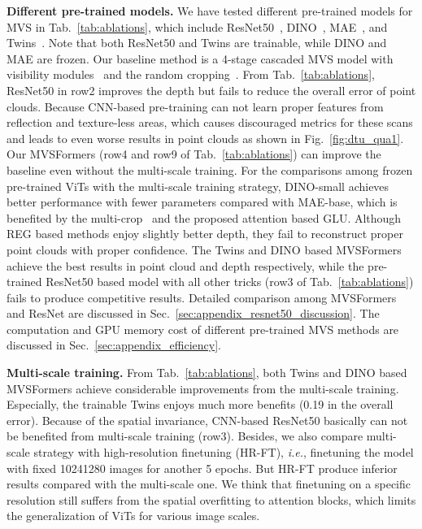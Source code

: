 \documentclass[10pt]{article} \usepackage[preprint]{tmlr}
\begin{document}
\noindent\textbf{Different pre-trained models.}
We have tested different pre-trained models for MVS in Tab.~\ref{tab:ablations}, which include ResNet50~\citep{he2016identity}, DINO~\citep{caron2021emerging}, MAE~\citep{he2021masked}, and Twins~\citep{chu2021twins}. Note that both ResNet50 and Twins are trainable, while DINO and MAE are frozen. Our baseline method is a 4-stage cascaded MVS model with visibility modules~\citep{zhang2020visibility} and the random cropping~\citep{mi2021generalized}. From Tab.~\ref{tab:ablations}, ResNet50 in row2 improves the depth but fails to reduce the overall error of point clouds. Because CNN-based pre-training can not learn proper features from reflection and texture-less areas, which causes discouraged metrics for these scans and leads to even worse results in point clouds as shown in Fig.~\ref{fig:dtu_qua1}. Our MVSFormers (row4 and row9 of Tab.~\ref{tab:ablations}) can improve the baseline even without the multi-scale training.
For the comparisons among frozen pre-trained ViTs with the multi-scale training strategy,
DINO-small achieves better performance with fewer parameters compared with MAE-base, which is benefited by the multi-crop~\citep{caron2020unsupervised} and the proposed attention based GLU. Although REG based methods enjoy slightly better depth, they fail to reconstruct proper point clouds with proper confidence.
The Twins and DINO based MVSFormers achieve the best results in point cloud and depth respectively, while the pre-trained ResNet50 based model with all other tricks (row3 of Tab.~\ref{tab:ablations}) fails to produce competitive results. Detailed comparison among MVSFormers and ResNet are discussed in Sec.~\ref{sec:appendix_resnet50_discussion}. The computation and GPU memory cost of different pre-trained MVS methods are discussed in Sec.~\ref{sec:appendix_efficiency}.

\noindent\textbf{Multi-scale training.}
From Tab.~\ref{tab:ablations}, both Twins and DINO based MVSFormers achieve considerable improvements from the multi-scale training. Especially, the trainable Twins enjoys much more benefits (0.19 in the overall error).
Because of the spatial invariance, CNN-based ResNet50 basically can not be benefited from  multi-scale training (row3).
Besides, we also compare  multi-scale strategy with high-resolution finetuning (HR-FT), \emph{i.e.}, finetuning the model with fixed 10241280 images for another 5 epochs. But HR-FT produce inferior results compared with the multi-scale one. 
We think that finetuning on a specific resolution still suffers from the spatial overfitting to attention blocks, which limits the generalization of ViTs for various image scales.
\end{document}
